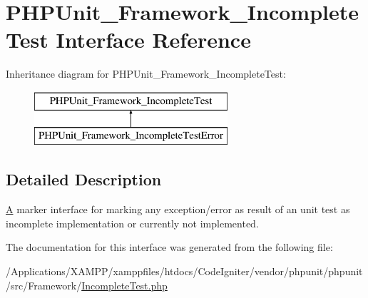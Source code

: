 \hypertarget{interface_p_h_p_unit___framework___incomplete_test}{}\section{P\+H\+P\+Unit\+\_\+\+Framework\+\_\+\+Incomplete\+Test Interface Reference}
\label{interface_p_h_p_unit___framework___incomplete_test}
Inheritance diagram for P\+H\+P\+Unit\+\_\+\+Framework\+\_\+\+Incomplete\+Test\+:\begin{figure}[H]
\begin{center}
\leavevmode
\includegraphics[height=2.000000cm]{interface_p_h_p_unit___framework___incomplete_test}
\end{center}
\end{figure}


\subsection{Detailed Description}
\mbox{\hyperlink{class_a}{A}} marker interface for marking any exception/error as result of an unit test as incomplete implementation or currently not implemented. 

The documentation for this interface was generated from the following file\+:\begin{DoxyCompactItemize}
\item 
/\+Applications/\+X\+A\+M\+P\+P/xamppfiles/htdocs/\+Code\+Igniter/vendor/phpunit/phpunit/src/\+Framework/\mbox{\hyperlink{src_2_framework_2_incomplete_test_8php}{Incomplete\+Test.\+php}}\end{DoxyCompactItemize}
